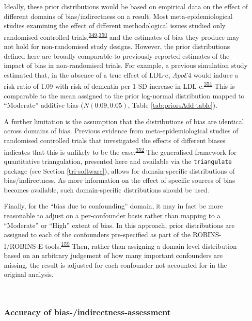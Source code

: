 \documentclass[a4paper, twoside]{templates/ociamthesis}
\begin{document}
Ideally, these prior distributions would be based on empirical data on the effect of different domains of bias/indirectness on a result. Most meta-epidemiological studies examining the effect of different methodological issues studied only randomised controlled trials,\textsuperscript{\protect\hyperlink{ref-amer2021}{349},\protect\hyperlink{ref-page2016}{350}} and the estimates of bias they produce may not hold for non-randomised study designs. However, the prior distributions defined here are broadly comparable to previously reported estimates of the impact of bias in non-randomised trials. For example, a previous simulation study estimated that, in the absence of a true effect of LDL-c, \emph{Apo}\(\mathcal{E}4\) would induce a risk ratio of 1.09 with risk of dementia per 1-SD increase in LDL-c.\textsuperscript{\protect\hyperlink{ref-iwagami2021}{351}} This is comparable to the mean assigned to the prior log-normal distribution mapped to ``Moderate'' additive bias (\(N(0.09,0.05)\), Table \ref{tab:priorsAdd-table}).

A further limitation is the assumption that the distributions of bias are identical across domains of bias. Previous evidence from meta-epidemiological studies of randomised controlled trials that investigated the effects of different biases indicates that this is unlikely to be the case.\textsuperscript{\protect\hyperlink{ref-savovic2018}{352}} The generalised framework for quantitative triangulation, presented here and available via the \texttt{triangulate} package (see Section \ref{tri-software}), allows for domain-specific distributions of bias/indirectness. As more information on the effect of specific sources of bias becomes available, such domain-specific distributions should be used.

Finally, for the ``bias due to confounding'' domain, it may in fact be more reasonable to adjust on a per-confounder basis rather than mapping to a ``Moderate'' or ``High'' extent of bias. In this approach, prior distributions are assigned to each of the confounders pre-specified as part of the ROBINS-I/ROBINS-E tools.\textsuperscript{\protect\hyperlink{ref-sterne2016}{159}} Then, rather than assigning a domain level distribution based on an arbitrary judgement of how many important confounders are missing, the result is adjusted for each confounder not accounted for in the original analysis.

~

\hypertarget{tri-accuracy}{%
\subsubsection{Accuracy of bias-/indirectness-assessment}\label{tri-accuracy}}
\end{document}
